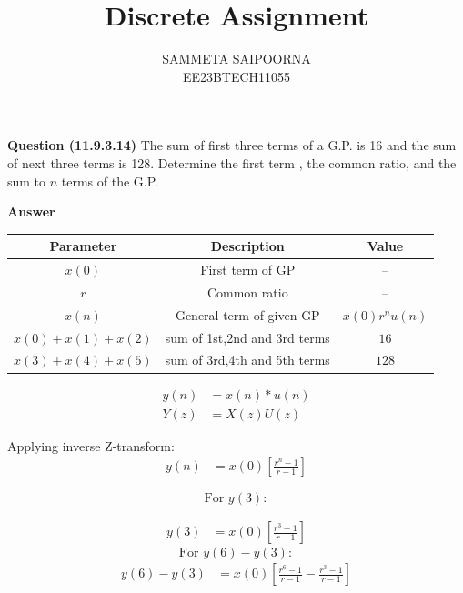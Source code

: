 \documentclass[journal,12pt,onecolumn]{IEEEtran}
\theoremstyle{remark}
\begin{document}
\let\vec\mathbf



\bigskip

\renewcommand{\thefigure}{\theenumi}
\renewcommand{\thetable}{\theenumi}

\title{Discrete Assignment}
\author{SAMMETA SAIPOORNA\\ EE23BTECH11055}
\maketitle
\textbf{Question (11.9.3.14)}
The sum of first three terms of a G.P. is 16 and the sum of next three terms is 128. Determine the first term , the common ratio, and the sum to $n$ terms of the G.P.


\textbf{Answer}


\begin{tabular}{|c|c|c|}
      \hline
      Parameter & Description & Value\\\hline
      $x(0)$ & First term of GP & --\\\hline
      $r$ & Common ratio & --\\\hline
      $x(n)$ & General term of given GP & $x(0)r^nu(n)$\\\hline
      $x(0)+x(1)+x(2)$ & sum of 1st,2nd and 3rd terms & $16$\\\hline
      $x(3)+x(4)+x(5)$ & sum of 3rd,4th and 5th terms & $128$\\\hline
\end{tabular}

\begin{align}
y(n) &= x(n) * u(n) \label{eq:1} \\
Y(z) &= X(z) U(z) \label{eq:2}
\end{align}

Applying inverse Z-transform:
\begin{align}
y(n) &= x(0) \left[ \frac{r^n - 1}{r - 1} \right] \label{eq:3}
\end{align}

$$
\text{For } y(3):
$$

\begin{align}
y(3) &= x(0) \left[ \frac{r^3 - 1}{r - 1} \right] \label{eq:4}
\end{align}
$$
\text{For } y(6) - y(3):
$$
\begin{align}
y(6) - y(3) &= x(0) \left[ \frac{r^6 - 1}{r - 1} - \frac{r^3 - 1}{r - 1} \right] \label{eq:5}
\end{align}
\end{document}
